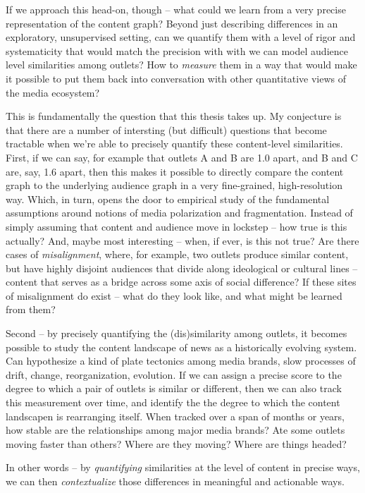 \documentclass{scrartcl}
\begin{document}
If we approach this head-on, though -- what could we learn from a very precise representation of the content graph? Beyond just describing differences in an exploratory, unsupervised setting, can we quantify them with a level of rigor and systematicity that would match the precision with with we can model audience level similarities among outlets? How to \textit{measure} them in a way that would make it possible to put them back into conversation with other quantitative views of the media ecosystem?

This is fundamentally the question that this thesis takes up. My conjecture is that there are a number of intersting (but difficult) questions that become tractable when we're able to precisely quantify these content-level similarities. First, if we can say, for example that outlets A and B are 1.0 apart, and B and C are, say, 1.6 apart, then this makes it possible to directly compare the content graph to the underlying audience graph in a very fine-grained, high-resolution way. Which, in turn, opens the door to empirical study of the fundamental assumptions around notions of media polarization and fragmentation. Instead of simply assuming that content and audience move in lockstep -- how true is this actually? And, maybe most interesting -- when, if ever, is this not true? Are there cases of \textit{misalignment}, where, for example, two outlets produce similar content, but have highly disjoint audiences that divide along ideological or cultural lines -- content that serves as a bridge across some axis of social difference? If these sites of  misalignment do exist -- what do they look like, and what might be learned from them?

Second -- by precisely quantifying the (dis)similarity among outlets, it becomes possible to study the content landscape of news as a historically evolving system. Can hypothesize a kind of plate tectonics among media brands, slow processes of drift, change, reorganization, evolution. If we can assign a precise score to the degree to which a pair of outlets is similar or different, then we can also track this measurement over time, and identify the the degree to which the content landscapen is rearranging itself. When tracked over a span of months or years, how stable are the relationships among major media brands? Ate some outlets moving faster than others? Where are they moving? Where are things headed?

In other words -- by \textit{quantifying} similarities at the level of content in precise ways, we can then \textit{contextualize} those differences in meaningful and actionable ways.
\end{document}
